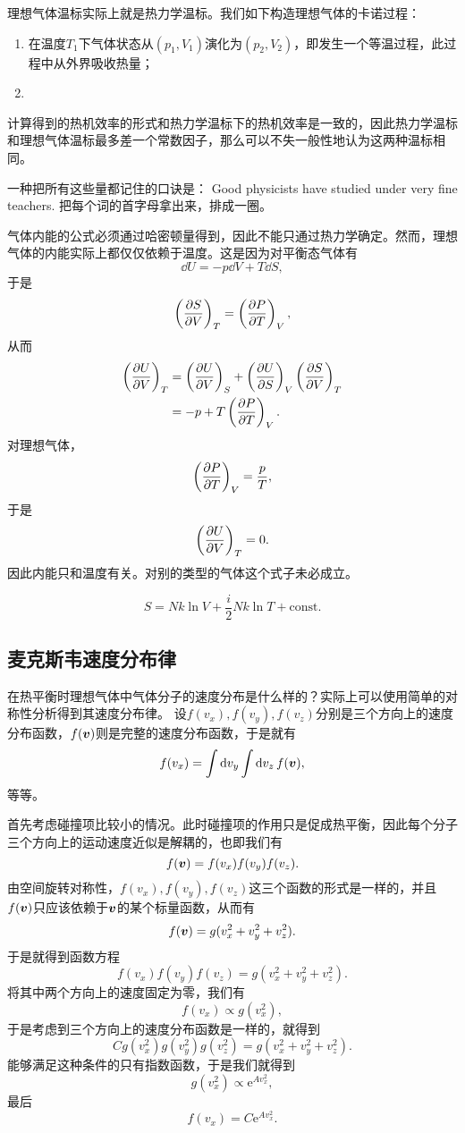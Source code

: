 \documentclass[hyperref, UTF8, a4paper]{ctexart}
\newcommand*{\ee}{\mathrm{e}}
\newcommand*{\const}{\mathrm{const}}
\begin{document}
理想气体温标实际上就是热力学温标。我们如下构造理想气体的卡诺过程：
\begin{enumerate}
    \item 在温度$T_1$下气体状态从$(p_1, V_1)$演化为$(p_2, V_2)$，即发生一个等温过程，此过程中从外界吸收热量；
    \item 
\end{enumerate}

计算得到的热机效率的形式和热力学温标下的热机效率是一致的，因此热力学温标和理想气体温标最多差一个常数因子，那么可以不失一般性地认为这两种温标相同。

一种把所有这些量都记住的口诀是：
Good physicists have studied under very fine teachers.
把每个词的首字母拿出来，排成一圈。

气体内能的公式必须通过哈密顿量得到，因此不能只通过热力学确定。然而，理想气体的内能实际上都仅仅依赖于温度。这是因为对平衡态气体有
\[
    \dd{U} = - p \dd{V} + T \dd{S},
\]
于是
\[
    \left(\pdv{S}{V}\right)_T = \left(\pdv{P}{T}\right)_V,
\]
从而
\[
    \begin{aligned}
        \left(\pdv{U}{V}\right)_T &= \left(\pdv{U}{V}\right)_S + \left(\pdv{U}{S}\right)_V \left(\pdv{S}{V}\right)_T \\
        &= - p + T \left(\pdv{P}{T}\right)_V.
    \end{aligned}
\]
对理想气体，
\[
    \left(\pdv{P}{T}\right)_V = \frac{p}{T},
\]
于是
\[
    \left(\pdv{U}{V}\right)_T = 0.
\]
因此内能只和温度有关。对别的类型的气体这个式子未必成立。

\begin{equation}
    S = Nk \ln V + \frac{i}{2} Nk \ln T + \const.
    \label{eq:entropy-from-thermodynamics}
\end{equation}

\subsection{麦克斯韦速度分布律}

在热平衡时理想气体中气体分子的速度分布是什么样的？实际上可以使用简单的对称性分析得到其速度分布律。
设$f(v_x),f(v_y),f(v_z)$分别是三个方向上的速度分布函数，$f(\vb*{v})$则是完整的速度分布函数，于是就有
\[
    f(v_x) = \int \dd{v_y} \int \dd{v_z} f(\vb*{v}),
\]
等等。

首先考虑碰撞项比较小的情况。此时碰撞项的作用只是促成热平衡，因此每个分子三个方向上的运动速度近似是解耦的，也即我们有
\[
    f(\vb*{v}) = f(v_x) f(v_y) f(v_z).
\]
由空间旋转对称性，$f(v_x),f(v_y),f(v_z)$这三个函数的形式是一样的，并且$f(\vb*{v})$只应该依赖于$\vb*{v}$的某个标量函数，从而有
\[
    f(\vb*{v}) = g(v_x^2+v_y^2+v_z^2).
\]
于是就得到函数方程
\[
    f(v_x) f(v_y) f(v_z) = g(v_x^2+v_y^2+v_z^2).
\]
将其中两个方向上的速度固定为零，我们有
\[
    f(v_x) \propto g(v_x^2),
\]
于是考虑到三个方向上的速度分布函数是一样的，就得到
\[
    C g(v_x^2) g(v_y^2) g(v_z^2) = g(v_x^2+v_y^2+v_z^2).
\]
能够满足这种条件的只有指数函数，于是我们就得到
\[
    g(v_x^2) \propto \ee^{A v_x^2},
\]
最后
\[
    f(v_x) = C \ee^{A v_x^2}.
\]
\end{document}
